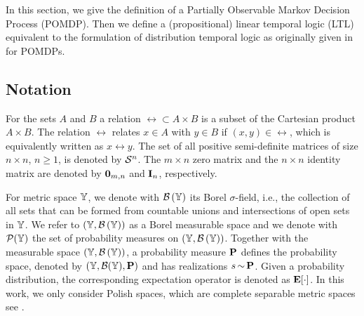\documentclass{ifacconf}
\begin{document}
In this section, we give the definition of a Partially Observable Markov Decision Process (POMDP). Then we define a (propositional) linear temporal logic (LTL)  equivalent to the formulation of distribution temporal logic as originally given in \citep{JonesDTL2013} for POMDPs. 


\subsection{Notation}

For the sets $A$ and $B$ a relation $\rel\subset A\times B$ is a subset of the Cartesian product $A\times B$. The relation $\rel$ relates $x\in A$ with $y\in B$ if $(x,y)\in\rel$, which is equivalently written as $x\rel y$.
%    
%   
%    
%    
    The set of all positive semi-definite matrices of size
    $n \times n$, $n \geq 1$, is denoted by $\mathcal S^n$.    The $m \times n$ zero matrix and the $n \times n$ identity matrix are denoted by $\mathbf{0}_{m, n}$ and $\mathbf{I}_n$, respectively.
   
For metric space ${\mathbb{Y}}$, we denote with  $\mathcal{B}\left({\mathbb{Y}}\right)$ its Borel $\sigma$-field, i.e., the  
collection of all sets that can be formed from countable unions and intersections of open sets in ${\mathbb{Y}}$.
We refer to  $({\mathbb{Y}},\mathcal{B}\left({\mathbb{Y}}\right))$ as a Borel measurable space and we denote with $\mathcal P({\mathbb{Y}})$ the set of probability measures on $({\mathbb{Y}},\mathcal{B}\left({\mathbb{Y}}\right))$.
Together with the measurable space $({\mathbb{Y}},\mathcal{B}\left({\mathbb{Y}}\right))$,  a probability measure $\mathbf{P}$ defines the probability space, denoted by $({\mathbb{Y}},\mathcal{B}({\mathbb{Y}}),\mathbf{P})$ and has realizations  $s{\,\sim\,}\mathbf{P}$.     Given a probability distribution, the corresponding expectation operator is denoted as  $\mathbf{E}[\cdot]$.
In this work,  we only consider Polish spaces, which are complete separable metric spaces see \citep{bogachev2007measure}. 
\end{document}
